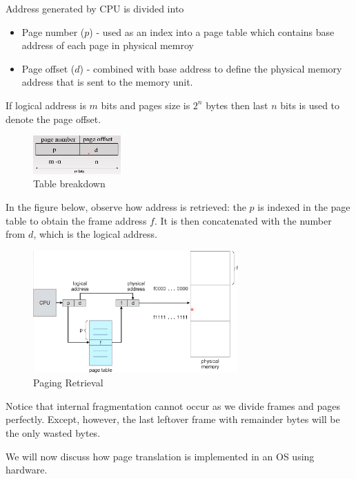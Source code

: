 \documentclass[a4paper]{article}
\theoremstyle{plain}
\theoremstyle{definition}
\newtheorem{defn}{Definition}[section]
\theoremstyle{remark}
\begin{document}
\begin{tcolorbox}[colback=black!3!white,colframe=black!60!white,title=\begin{defn}Logical Address under Paging \label{Logical Address under Paging}\end{defn}]
Address generated by CPU is divided into
\begin{itemize}
	\item Page number ($p$) - used as an index into a page table which contains base address of each page in physical memroy
	\item Page offset ($d$) - combined with base address to define the physical memory address that is sent to the memory unit.
\end{itemize}
If logical address is $m$ bits and pages size is $2^{n}$ bytes then last $n$ bits is used to denote the page offset.
\begin{figure}[H]
	\centering
	\includegraphics[width=0.3\textwidth]{seventythree.png}
	\caption{Table breakdown}
	\label{fig:seventythree-png}
\end{figure}
In the figure below, observe how address is retrieved: the $p$ is indexed in the page table to obtain the frame address $f$. It is then concatenated with the number from $d$, which is the logical address.
\begin{figure}[H]
	\centering
	\includegraphics[width=0.7\textwidth]{seventyfour.png}
	\caption{Paging Retrieval}
	\label{fig:seventyfour-png}
\end{figure}
Notice that internal fragmentation cannot occur as we divide frames and pages perfectly. Except, however, the last leftover frame with remainder bytes will be the only wasted bytes. 
\end{tcolorbox}
We will now discuss how page translation is implemented in an OS using hardware.
\end{document}
